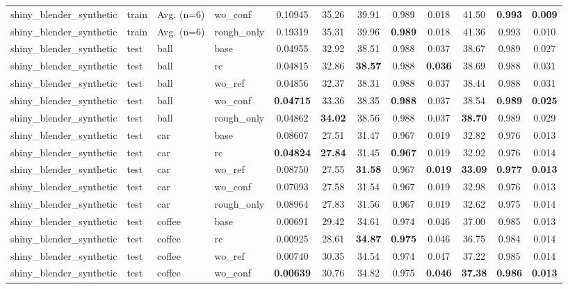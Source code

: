 \begin{table}[t]
{\begin{tabular}{llllcccccccc}
shiny\_blender\_synthetic & train & Avg. (n=6) & wo\_conf & 0.10945 & 35.26 & 39.91 & 0.989 & 0.018 & 41.50 & \textbf{0.993} & \textbf{0.009} \\
shiny\_blender\_synthetic & train & Avg. (n=6) & rough\_only & 0.19319 & 35.31 & 39.96 & \textbf{0.989} & 0.018 & 41.36 & 0.993 & 0.010 \\
\midrule
shiny\_blender\_synthetic & test & ball & base & 0.04955 & 32.92 & 38.51 & 0.988 & 0.037 & 38.67 & 0.989 & 0.027 \\
shiny\_blender\_synthetic & test & ball & rc & 0.04815 & 32.86 & \textbf{38.57} & 0.988 & \textbf{0.036} & 38.69 & 0.988 & 0.031 \\
shiny\_blender\_synthetic & test & ball & wo\_ref & 0.04856 & 32.37 & 38.31 & 0.988 & 0.037 & 38.44 & 0.988 & 0.031 \\
shiny\_blender\_synthetic & test & ball & wo\_conf & \textbf{0.04715} & 33.36 & 38.35 & \textbf{0.988} & 0.037 & 38.54 & \textbf{0.989} & \textbf{0.025} \\
shiny\_blender\_synthetic & test & ball & rough\_only & 0.04862 & \textbf{34.02} & 38.56 & 0.988 & 0.037 & \textbf{38.70} & 0.989 & 0.029 \\
shiny\_blender\_synthetic & test & car & base & 0.08607 & 27.51 & 31.47 & 0.967 & 0.019 & 32.82 & 0.976 & 0.013 \\
shiny\_blender\_synthetic & test & car & rc & \textbf{0.04824} & \textbf{27.84} & 31.45 & \textbf{0.967} & 0.019 & 32.92 & 0.976 & 0.014 \\
shiny\_blender\_synthetic & test & car & wo\_ref & 0.08750 & 27.55 & \textbf{31.58} & 0.967 & \textbf{0.019} & \textbf{33.09} & \textbf{0.977} & \textbf{0.013} \\
shiny\_blender\_synthetic & test & car & wo\_conf & 0.07093 & 27.58 & 31.54 & 0.967 & 0.019 & 32.98 & 0.976 & 0.013 \\
shiny\_blender\_synthetic & test & car & rough\_only & 0.08964 & 27.83 & 31.56 & 0.967 & 0.019 & 32.62 & 0.975 & 0.014 \\
shiny\_blender\_synthetic & test & coffee & base & 0.00691 & 29.42 & 34.61 & 0.974 & 0.046 & 37.00 & 0.985 & 0.013 \\
shiny\_blender\_synthetic & test & coffee & rc & 0.00925 & 28.61 & \textbf{34.87} & \textbf{0.975} & 0.046 & 36.75 & 0.984 & 0.014 \\
shiny\_blender\_synthetic & test & coffee & wo\_ref & 0.00740 & 30.35 & 34.54 & 0.974 & 0.047 & 37.22 & 0.985 & 0.014 \\
shiny\_blender\_synthetic & test & coffee & wo\_conf & \textbf{0.00639} & 30.76 & 34.82 & 0.975 & \textbf{0.046} & \textbf{37.38} & \textbf{0.986} & \textbf{0.013} \\

\end{tabular}}
\end{table}
